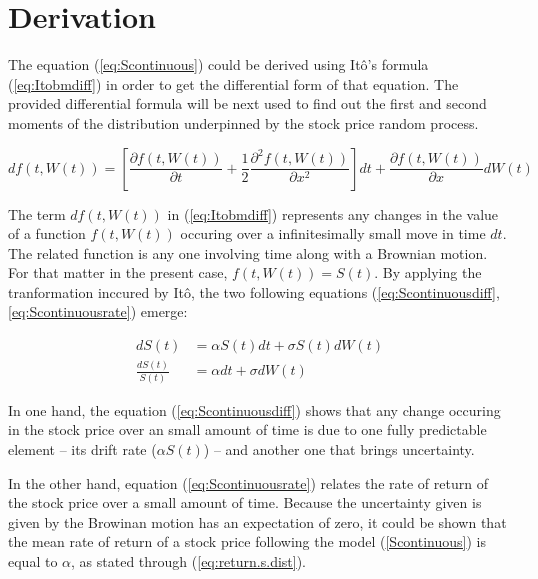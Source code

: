 \documentclass[12pt]{report}
\newcommand{\dBm}{dW\left(t\right)}
\newcommand{\Bm}{W\left(t\right)}
\newcommand{\ft}{f\left(t, \Bm \right)}
\newcommand{\St}{S\left(t\right)}
\newcommand{\dSt}{dS\left(t\right)}
\newcommand{\dSr}{\frac{\dSt}{\St}}
\newcommand{\Itobmdiff}{d\ft = \left[\frac{\partial \ft }{\partial t} + \frac{1}{2} \frac{\partial ^2\ft }{\partial x^2}\right]dt + \frac{\partial \ft}{\partial x} \dBm}
\newcommand{\Scontinousdiff}{d\St &= \alpha \St dt + \sigma \St \dBm}
\newcommand{\Scontinuousrate}{\dSr &= \alpha dt + \sigma \dBm}
\begin{document}
\section{Derivation}
\label{sec:Derivation}

The equation (\ref{eq:Scontinuous}) could be derived using Itô's formula (\ref{eq:Itobmdiff}) in order to get the differential form of that equation. The provided differential formula will be next used to find out the first and second moments of the distribution underpinned by the stock price random process.

\begin{center}
  \begin{equation}
    \Itobmdiff \label{eq:Itobmdiff}
  \end{equation}
\end{center}

The term $d\ft$ in (\ref{eq:Itobmdiff}) represents any changes in the value of a function $\ft$ occuring over a infinitesimally small move in time $dt$. The related function is any one involving time along with a Brownian motion. For that matter in the present case, $ \ft = \St $.
By applying the tranformation inccured by Itô, the two following equations (\ref{eq:Scontinuousdiff}, \ref{eq:Scontinuousrate}) emerge:
 
\begin{center}
  \begin{subequations}
    \begin{align}
      \Scontinousdiff \label{eq:Scontinuousdiff} \\
      \Scontinuousrate \label{eq:Scontinuousrate}
    \end{align}
  \end{subequations}
\end{center}

In one hand, the equation (\ref{eq:Scontinuousdiff}) shows that any change occuring in the stock price over an small amount of time is due to one fully predictable element -- its drift rate ($\alpha \St$) -- and another one that brings uncertainty.

In the other hand, equation (\ref{eq:Scontinuousrate}) relates the rate of return of the stock price over a small amount of time. Because the uncertainty given is given by the Browinan motion has an expectation of zero, it could be shown that the mean rate of return of a stock price following the model (\ref{Scontinuous}) is equal to $\alpha$, as stated through (\ref{eq:return.s.dist}).
\end{document}
